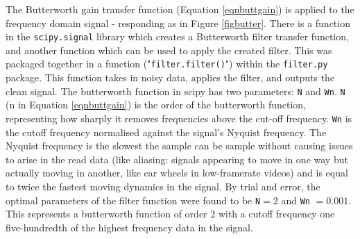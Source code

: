 \documentclass[twoside,a4]{report}
\def\br{\newline \newline \noindent}
\begin{document}
	
	\noindent
	The Butterworth gain transfer function (Equation \ref{eqnbuttgain}) is applied to the frequency domain signal - responding as in Figure \ref{figbutter}.
	There is a function in the \texttt{scipy.signal} library which creates a Butterworth filter transfer function, and another function which can be used to apply the created filter. This was packaged together in a function ("\texttt{filter.filter()}") within the \texttt{filter.py} package. This function takes in noisy data, applies the filter, and outputs the clean signal. 
	\br
	The butterworth function in scipy has two parameters: \texttt{N} and \texttt{Wn}. \texttt{N} (n in Equation \ref{eqnbuttgain}) is the order of the butterworth function, representing how sharply it removes frequencies above the cut-off frequency. \texttt{Wn} is the cutoff frequency normalised against the signal's Nyquist frequency. The Nyquist frequency is the slowest the sample can be sample without causing issues to arise in the read data (like aliasing: signals appearing to move in one way but actually moving in another, like car wheels in low-framerate videos) and is equal to twice the fastest moving dynamics in the signal. By trial and error, the optimal parameters of the filter function were found to be \texttt{N}$ = 2$ and \texttt{Wn} $ = 0.001$. This represents a butterworth function of order 2 with a cutoff frequency one five-hundredth of the highest frequency data in the signal.
	
\end{document}
